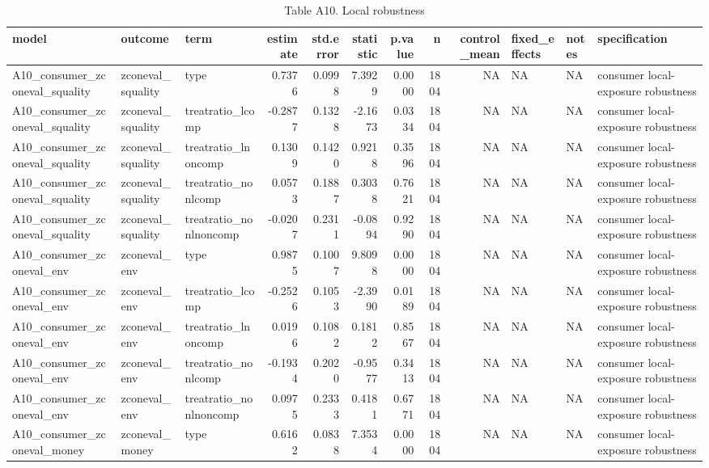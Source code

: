 \begin{table}

\caption{Table A10. Local robustness}
\centering
\begin{tabular}[t]{lllrrrrrrlll}
\toprule
model & outcome & term & estimate & std.error & statistic & p.value & n & control\_mean & fixed\_effects & notes & specification\\
\midrule
A10\_consumer\_zconeval\_squality & zconeval\_squality & type & 0.7376 & 0.0998 & 7.3929 & 0.0000 & 1804 & NA & NA & NA & consumer local-exposure robustness\\
A10\_consumer\_zconeval\_squality & zconeval\_squality & treatratio\_lcomp & -0.2877 & 0.1328 & -2.1673 & 0.0334 & 1804 & NA & NA & NA & consumer local-exposure robustness\\
A10\_consumer\_zconeval\_squality & zconeval\_squality & treatratio\_lnoncomp & 0.1309 & 0.1420 & 0.9218 & 0.3596 & 1804 & NA & NA & NA & consumer local-exposure robustness\\
A10\_consumer\_zconeval\_squality & zconeval\_squality & treatratio\_nonlcomp & 0.0573 & 0.1887 & 0.3038 & 0.7621 & 1804 & NA & NA & NA & consumer local-exposure robustness\\
A10\_consumer\_zconeval\_squality & zconeval\_squality & treatratio\_nonlnoncomp & -0.0207 & 0.2311 & -0.0894 & 0.9290 & 1804 & NA & NA & NA & consumer local-exposure robustness\\
\addlinespace
A10\_consumer\_zconeval\_env & zconeval\_env & type & 0.9875 & 0.1007 & 9.8098 & 0.0000 & 1804 & NA & NA & NA & consumer local-exposure robustness\\
A10\_consumer\_zconeval\_env & zconeval\_env & treatratio\_lcomp & -0.2526 & 0.1053 & -2.3990 & 0.0189 & 1804 & NA & NA & NA & consumer local-exposure robustness\\
A10\_consumer\_zconeval\_env & zconeval\_env & treatratio\_lnoncomp & 0.0196 & 0.1082 & 0.1812 & 0.8567 & 1804 & NA & NA & NA & consumer local-exposure robustness\\
A10\_consumer\_zconeval\_env & zconeval\_env & treatratio\_nonlcomp & -0.1934 & 0.2020 & -0.9577 & 0.3413 & 1804 & NA & NA & NA & consumer local-exposure robustness\\
A10\_consumer\_zconeval\_env & zconeval\_env & treatratio\_nonlnoncomp & 0.0975 & 0.2333 & 0.4181 & 0.6771 & 1804 & NA & NA & NA & consumer local-exposure robustness\\
\addlinespace
A10\_consumer\_zconeval\_money & zconeval\_money & type & 0.6162 & 0.0838 & 7.3534 & 0.0000 & 1804 & NA & NA & NA & consumer local-exposure robustness\\

\end{tabular}
\end{table}
